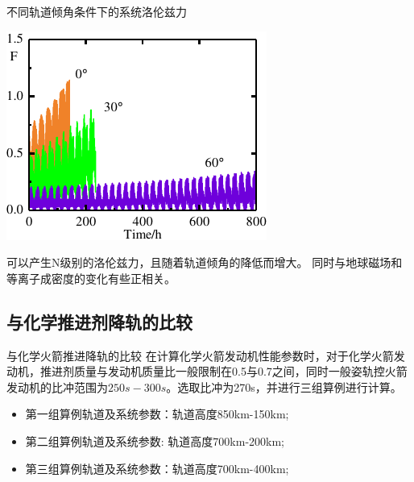 \documentclass[sectioncirclenumberstyle]{le2iutbmbeamer}
\begin{document}
\begin{frame}{不同轨道倾角条件下的系统洛伦兹力}
\begin{minipage}{0.6\textwidth}
\includegraphics[width=\linewidth]{figures/f}

\end{minipage}%
\begin{minipage}{0.4\textwidth}
可以产生N级别的洛伦兹力，且随着轨道倾角的降低而增大。
同时与地球磁场和等离子成密度的变化有些正相关。
\end{minipage}%
\end{frame}

\subsection{与化学推进剂降轨的比较}
\begin{frame}{与化学火箭推进降轨的比较}
在计算化学火箭发动机性能参数时，对于化学火箭发动机，推进剂质量与发动机质量比一般限制在0.5与0.7之间，同时一般姿轨控火箭发动机的比冲范围为$250s-300s$。选取比冲为270s，并进行三组算例进行计算。
\begin{itemize}
\item 第一组算例轨道及系统参数：轨道高度850km-150km;
\item 第二组算例轨道及系统参数: 轨道高度700km-200km;
\item 第三组算例轨道及系统参数：轨道高度700km-400km;
\end{itemize}
\end{frame}
\end{document}
